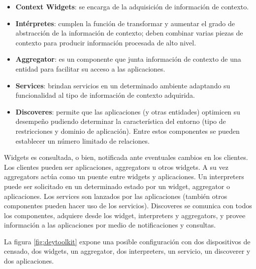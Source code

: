 \begin{itemize}

\item 
\textbf{Context Widgets}: se encarga de la adquisición de información de
contexto.

\item
\textbf{Intérpretes}: cumplen la función de transformar y aumentar el grado de
abstracción de la información de contexto; deben combinar varias piezas de
contexto para producir información procesada de alto nivel.

\item
\textbf{Aggregator}: es un componente que junta información de contexto de una
entidad para facilitar su acceso a las aplicaciones.

\item
\textbf{Services}: brindan servicios en un determinado ambiente adaptando su
funcionalidad al tipo de información de contexto adquirida.

\item
\textbf{Discoveres}: permite que las aplicaciones (y otras entidades) optimicen
su desempeño pudiendo determinar la característica del entorno (tipo de
restricciones y dominio de aplicación). Entre estos componentes se pueden
establecer un número limitado de relaciones.

\end{itemize} 

Widgets es consultada, o bien, notificada ante eventuales cambios en los
clientes. Los
clientes pueden ser aplicaciones, aggregators u otros widgets. A su vez
aggregators
actúa como un puente entre widgets y aplicaciones. Un interpreters puede ser
solicitado
en un determinado estado por un widget, aggregator o aplicaciones. Los services
son
lanzados por las aplicaciones (también otros componentes pueden hacer uso de los
servicios). Discoveres se comunica con todos los componentes, adquiere desde los
widget, interpreters y aggregators, y provee información a las aplicaciones por
medio
de notificaciones y consultas.

La figura \ref{fig:deytoolkit} expone una posible configuración con dos
dispositivos de censado, dos
widgets, un aggregator, dos interpreters, un servicio, un discoverer y dos
aplicaciones.

